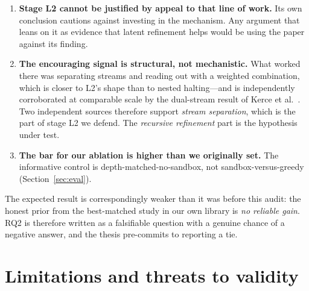 \documentclass[11pt,a4paper]{article}
\theoremstyle{plain}
\theoremstyle{definition}
\theoremstyle{remark}
\begin{document}
\begin{enumerate}
  \item \textbf{Stage L2 cannot be justified by appeal to that line of work.}
    Its own conclusion cautions against investing in the mechanism. Any
    argument that leans on it as evidence that latent refinement helps would
    be using the paper against its finding.
  \item \textbf{The encouraging signal is structural, not mechanistic.} What
    worked there was separating streams and reading out with a weighted
    combination, which is closer to L2's shape than to nested halting---and is
    independently corroborated at comparable scale by the dual-stream result of
    Kerce et al.~\cite{kerce2026dualstream}. Two independent sources therefore support
    \emph{stream separation}, which is the part of stage L2 we defend. The
    \emph{recursive refinement} part is the hypothesis under test.
  \item \textbf{The bar for our ablation is higher than we originally set.} The
    informative control is depth-matched-no-sandbox, not sandbox-versus-greedy
    (Section~\ref{sec:eval}).
\end{enumerate}

\noindent
The expected result is correspondingly weaker than it was before this audit:
the honest prior from the best-matched study in our own library is \emph{no
reliable gain}. RQ2 is therefore written as a falsifiable question with a
genuine chance of a negative answer, and the thesis pre-commits to reporting a
tie.

\section{Limitations and threats to validity}
\label{sec:limitations}
\end{document}
